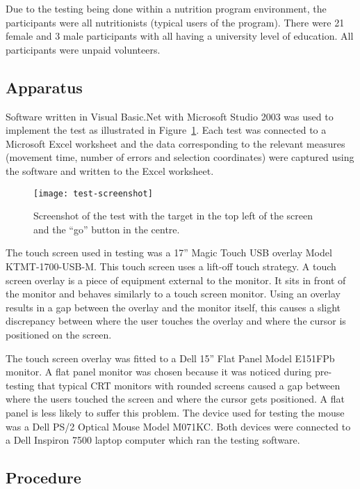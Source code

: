 \documentclass{elsart}
\begin{document}
Due to the testing being done within a nutrition program environment,
the participants were all nutritionists (typical users of the program).
There were 21 female and 3 male participants with all having a
university level of education. All participants were unpaid volunteers.

\subsection{Apparatus}
\label{sec-method-apparatus}

Software written in Visual Basic.Net with Microsoft Studio 2003 was used
to implement the test as illustrated in
Figure~\ref{fig-test-screenshot}. Each test was connected to a Microsoft
Excel worksheet and the data corresponding to the relevant measures
(movement time, number of errors and selection coordinates) were
captured using the software and written to the Excel worksheet.

\begin{figure}
	\centering
	\texttt{[image: test-screenshot]}
	\caption{Screenshot of the test with the target in the top left of
	the screen and the ``go'' button in the centre.}
	\label{fig-test-screenshot}
\end{figure}

The touch screen used in testing was a 17'' Magic Touch USB overlay
Model KTMT-1700-USB-M. This touch screen uses a lift-off touch strategy.
A touch screen overlay is a piece of equipment external to the monitor.
It sits in front of the monitor and behaves similarly to a touch screen
monitor. Using an overlay results in a gap between the overlay and the
monitor itself, this causes a slight discrepancy between where the user
touches the overlay and where the cursor is positioned on the screen.

The touch screen overlay was fitted to a Dell 15'' Flat Panel Model
E151FPb monitor. A flat panel monitor was chosen because it was noticed
during pre-testing that typical CRT monitors with rounded screens caused
a gap between where the users touched the screen and where the cursor
gets positioned. A flat panel is less likely to suffer this problem. The
device used for testing the mouse was a Dell PS/2 Optical Mouse Model
M071KC. Both devices were connected to a Dell Inspiron 7500 laptop
computer which ran the testing software.

\subsection{Procedure}
\label{sec-method-procedure}
\end{document}
